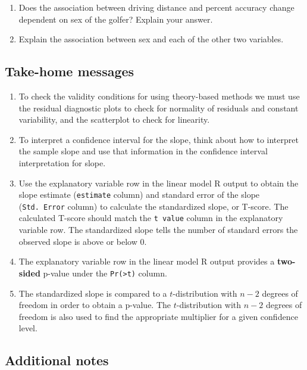 \documentclass[
]{report}
\begin{document}
\begin{enumerate}
\def\labelenumi{\arabic{enumi}.}
\setcounter{enumi}{14}
\item
  Does the association between driving distance and percent accuracy change dependent on sex of the golfer? Explain your answer.
  \vspace{1in}
\item
  Explain the association between sex and each of the other two variables.
  \newpage
\end{enumerate}

\hypertarget{take-home-messages-7}{%
\subsection{Take-home messages}\label{take-home-messages-7}}

\begin{enumerate}
\def\labelenumi{\arabic{enumi}.}
\item
  To check the validity conditions for using theory-based methods we must use the residual diagnostic plots to check for normality of residuals and constant variability, and the scatterplot to check for linearity.
\item
  To interpret a confidence interval for the slope, think about how to interpret the sample slope and use that information in the confidence interval interpretation for slope.
\item
  Use the explanatory variable row in the linear model R output to obtain the slope estimate (\texttt{estimate} column) and standard error of the slope (\texttt{Std.\ Error} column) to calculate the standardized slope, or T-score. The calculated T-score should match the \texttt{t\ value} column in the explanatory variable row. The standardized slope tells the number of standard errors the observed slope is above or below 0.
\item
  The explanatory variable row in the linear model R output provides a \textbf{two-sided} p-value under the \texttt{Pr(\textgreater{}\textbar{}t\textbar{})} column.
\item
  The standardized slope is compared to a \(t\)-distribution with \(n-2\) degrees of freedom in order to obtain a p-value. The \(t\)-distribution with \(n-2\) degrees of freedom is also used to find the appropriate multiplier for a given confidence level.
\end{enumerate}

\hypertarget{additional-notes-7}{%
\subsection{Additional notes}\label{additional-notes-7}}
\end{document}
